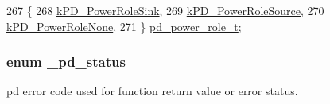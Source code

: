\begin{DoxyCode}
267 \{
268     \hyperlink{group__usb__pd__stack_gga46146487374ddc31d48f33b2b6a26f8bafca465150c227ef579c7a2bfc47b4072}{kPD\_PowerRoleSink},   
269     \hyperlink{group__usb__pd__stack_gga46146487374ddc31d48f33b2b6a26f8ba9fdae65ce89c7d877981a3abef33a2cb}{kPD\_PowerRoleSource}, 
270     \hyperlink{group__usb__pd__stack_gga46146487374ddc31d48f33b2b6a26f8bae0c041be8e861b6b6e95444d9b83c99f}{kPD\_PowerRoleNone},   
271 \} \hyperlink{group__usb__pd__stack_ga19f0723d5c2d772a03d075636497183f}{pd\_power\_role\_t};
\end{DoxyCode}
\hypertarget{group__usb__pd__stack_gaaad4cd00dd02567c6169429e3a895073}{
\subsubsection[{\-\_\-pd\-\_\-status}]{\setlength{\rightskip}{0pt plus 5cm}enum {\bf \-\_\-pd\-\_\-status}}}\label{group__usb__pd__stack_gaaad4cd00dd02567c6169429e3a895073}


pd error code used for function return value or error status. 

